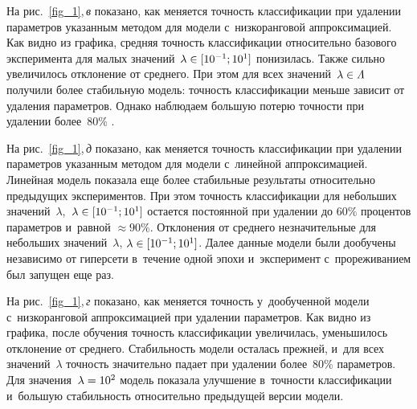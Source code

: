 \begin{multicols}{2}
На рис.~\ref{fig_1},\,\textit{в} показано, как меняется точность классификации при 
удалении параметров указанным методом для модели с~низкоранговой аппроксимацией. 
Как видно из графика, средняя \mbox{точность} классификации относительно базового 
эксперимента для малых значений~$\lambda\hm \in [10^{-1}; 10^1]$ понизилась. Также 
сильно увеличилось отклонение от среднего.
При этом для всех значений~$\lambda \hm\in \varLambda$ получили более стабильную 
модель: точ\-ность классификации меньше зависит от удаления параметров. Однако 
наблюдаем большую потерю точности при удалении более~80\% .

На рис.~\ref{fig_1},\,\textit{д} показано, как меняется точность классификации при 
удалении параметров указанным методом для модели с~линейной аппроксимацией.
Линейная модель показала еще более стабильные результаты относительно предыдущих 
экспериментов. При этом точность классификации для небольших 
значений~$\lambda$,~$\lambda \hm\in [10^{-1}; 10^1]$ остается постоянной при 
удалении до $60\%$ процентов параметров и~равной $\approx 90\%$. Отклонения от 
среднего незначительные для небольших значений~$\lambda$, $\lambda \hm\in 
[10^{-1}; 10^1]$.  Далее данные модели были дообучены независимо от гиперсети 
в~течение одной эпохи и~эксперимент с~прореживанием был запущен еще раз.



На рис.~\ref{fig_1},\,\textit{г} показано, как меняется точность у~дообученной модели 
с~низкоранговой аппроксимацией при удалении параметров. Как видно из графика, 
после обучения точность классификации увеличилась, уменьшилось отклонение от 
среднего. Стабильность модели осталась прежней, и~для всех значений~$\lambda$ 
точность значительно падает при удалении  более~$ 80\% $ параметров.
Для значения~$\lambda \hm= 10^2$ модель показала улучшение в~точ\-ности классификации и~большую стабильность относительно предыдущей версии модели.

\begin{table*}\small %
\begin{center}
\label{t3}
\vspace*{2ex}


\end{center}
\end{table*}
\end{multicols}
